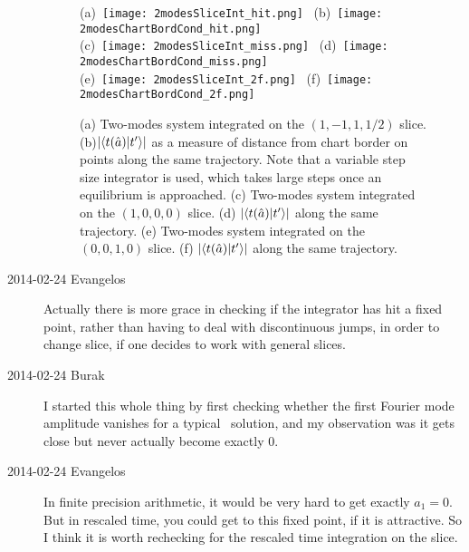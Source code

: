 \begin{description}
\begin{figure}%
\begin{center}
(a)~\texttt{[image: 2modesSliceInt\_hit.png]}~
(b)~\texttt{[image: 2modesChartBordCond\_hit.png]}\\
(c)~\texttt{[image: 2modesSliceInt\_miss.png]}~
(d)~\texttt{[image: 2modesChartBordCond\_miss.png]}\\
(e)~\texttt{[image: 2modesSliceInt\_2f.png]}~
(f)~\texttt{[image: 2modesChartBordCond\_2f.png]}
\end{center}
\caption{(a) Two-modes system integrated on the $(1,-1,1, 1/2)$ slice. (b)$|\langle t(\hat{a})|t'_{}\rangle|$
as a measure of distance from chart border on points along the same trajectory.
Note that a variable step size integrator is used, which takes large steps once an equilibrium is approached.
(c) Two-modes system integrated on the $(1,0,0,0)$ slice.
(d) $|\langle t(\hat{a})|t'_{}\rangle|$ along the same trajectory.
(e) Two-modes system integrated on the $(0,0,1,0)$ slice.
(f) $|\langle t(\hat{a})|t'_{}\rangle|$ along the same trajectory.
    }
\label{fig:2modes_hit}
\end{figure}

\item[2014-02-24 Evangelos] Actually there is more grace in
checking if the integrator has hit a fixed point, rather than having to
deal with discontinuous jumps, in order to change slice, if one decides
to work with general slices.

\item[2014-02-24 Burak] I started this whole thing by first checking whether
the first Fourier mode amplitude vanishes for a typical \KSe\ solution, and
my observation was it gets close but never actually become exactly 0.

\item[2014-02-24 Evangelos] In finite precision arithmetic, it would be very hard
to get exactly $a_1=0$. But in rescaled time, you could get to this fixed point,
if it is attractive. So I think it is worth rechecking for the rescaled time
integration on the slice.


\end{description}
